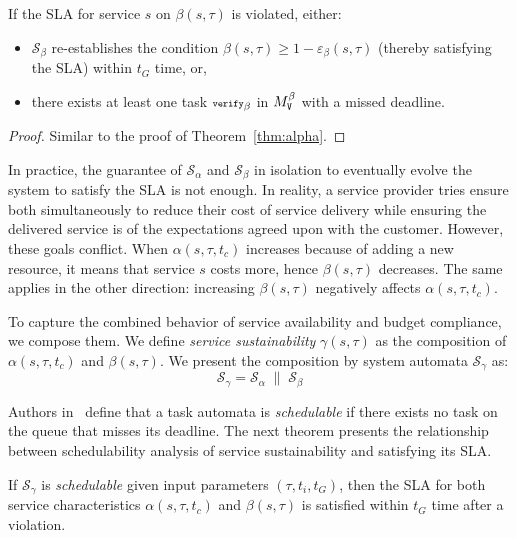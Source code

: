 \begin{thm}
\label{thm:beta}
If the SLA for service $s$ on $\beta(s,\tau)$ is violated, either:
\begin{itemize}
\item $\mathcal{S}_\beta$ re-establishes the condition $\beta(s,\tau) \geq 1-\varepsilon_\beta(s,\tau)$ (thereby satisfying the SLA) within $t_G$ time, or,
\item there exists at least one task ${\scriptsize\texttt{verify}}_\beta$ in $M^{\beta}_{{\scriptsize\texttt{V}}}$ with a missed deadline. 
\end{itemize}
\end{thm}

\begin{proof}
Similar to the proof of Theorem~\ref{thm:alpha}.
\end{proof}

In practice, the guarantee of $\mathcal{S}_\alpha$ and $\mathcal{S}_\beta$
in isolation to eventually evolve the system to satisfy the SLA is not enough.
In reality, a service provider tries ensure both simultaneously to reduce their cost of service delivery while ensuring the delivered service is of the expectations agreed upon with the customer.
However, these goals conflict.
When $\alpha(s,\tau,t_c)$ increases because of adding a new resource,
it means that service $s$ costs more, hence $\beta(s,\tau)$ decreases.
The same applies in the other direction: increasing $\beta(s,\tau)$
negatively affects $\alpha(s,\tau,t_c)$.

To capture the combined behavior of service availability and budget compliance,
we compose them. 
We define \emph{service sustainability} $\gamma(s,\tau)$ as the composition of $\alpha(s,\tau,t_c)$ and $\beta(s,\tau)$.
We present the composition by system automata $\mathcal{S}_\gamma$ as:
\[
\mathcal{S}_\gamma = \mathcal{S}_\alpha \; \parallel \; \mathcal{S}_\beta
\]

Authors in~\cite{fersman2007task} define that a task automata is \emph{schedulable} if there exists no task on the queue that misses its deadline. 
The next theorem presents the relationship between schedulability analysis of service sustainability and satisfying its SLA.

\begin{thm}
\label{thm:gamma}
If $\mathcal{S}_\gamma$ is \emph{schedulable} given input parameters $(\tau, t_i, t_G)$, then the SLA for both service characteristics $\alpha(s,\tau,t_c)$ and $\beta(s,\tau)$ is satisfied within $t_G$ time after a violation.
\end{thm}

